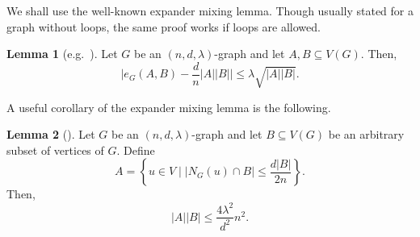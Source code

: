 \documentclass{article}
\theoremstyle{plain}
\newtheorem{lemma}[theorem]{Lemma}
\theoremstyle{definition}
\newtheorem{lemma}{Lemma}
\begin{document}
We shall use the well-known expander mixing lemma. Though usually stated for a graph without loops, the same proof works if loops are allowed.
\begin{lemma}[e.g.~{\cite[Corollary~9.2.5]{alon-spencer}}] \label{lem:expander-mixing}
    Let $G$ be an $(n, d, \lambda)$-graph and let $A, B \subseteq V(G)$. Then,
    \[ \big| e_G(A, B) - \frac{d}{n} |A||B| \big| \le \lambda \sqrt{|A||B|} . \]
\end{lemma}

A useful corollary of the expander mixing lemma is the following.
\begin{lemma}[{\cite[Lemma~2.2]{alon-rodl}}] \label{lem:BC}
    Let $G$ be an $(n, d, \lambda)$-graph and let $B \subseteq V(G)$ be an arbitrary subset of vertices of $G$. Define
    \[ A = \left\{ u \in V \mid |N_G(u) \cap B| \le \frac{d|B|}{2n} \right\}. \]
    Then,
    \[ |A| |B| \le \frac{4 \lambda^2}{d^2} n^2. \]
\end{lemma}
\end{document}
